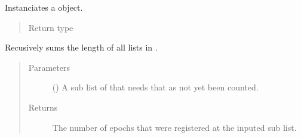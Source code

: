\documentclass[letterpaper,10pt,english]{sphinxmanual}
\begin{document}
\begin{fulllineitems}
\begin{fulllineitems}
\begin{quote}
\begin{description}
\end{description}\end{quote}

\end{fulllineitems}


\begin{fulllineitems}
\label{\detokenize{app.domain.helpers:app.domain.helpers.smart_dataclasses.LoggingData.__init__}}
Instanciates a  object.
\begin{quote}\begin{description}
\item[{Return type}] \leavevmode
{}

\end{description}\end{quote}

\end{fulllineitems}


\begin{fulllineitems}
\label{\detokenize{app.domain.helpers:app.domain.helpers.smart_dataclasses.LoggingData._recursive_len}}
Recusively sums the length of all lists in {\hyperref[\detokenize{app.domain.helpers:app.domain.helpers.smart_dataclasses.LoggingData.convergence_sets}]{}}.
\begin{quote}\begin{description}
\item[{Parameters}] \leavevmode
{} () \textendash{} A sub list of {\hyperref[\detokenize{app.domain.helpers:app.domain.helpers.smart_dataclasses.LoggingData.convergence_sets}]{}} that needs that
as not yet been counted.

\item[{Returns}] \leavevmode
The number of epochs that were registered at the inputed sub list.


\end{description}
\end{quote}
\end{fulllineitems}
\end{fulllineitems}
\end{document}
